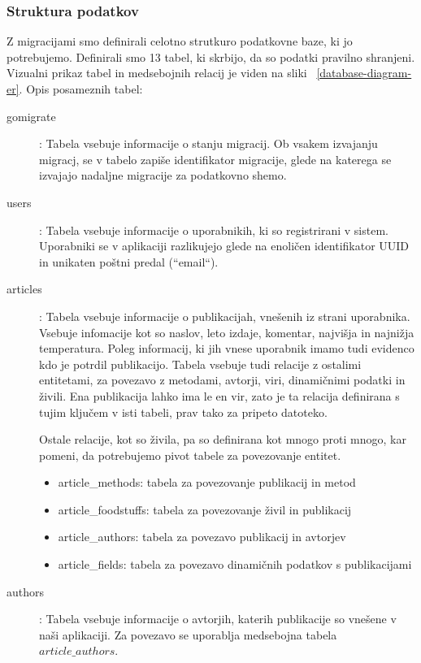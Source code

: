 \documentclass[a4paper, 12pt]{book}
\begin{document}
\subsubsection{ Struktura podatkov }
Z migracijami smo definirali celotno strutkuro podatkovne baze, ki jo potrebujemo. Definirali smo 13 tabel, ki skrbijo, da so podatki pravilno shranjeni. Vizualni prikaz tabel in medsebojnih relacij je viden na sliki ~\ref{database-diagram-er}. Opis posameznih tabel:
\begin{description}
\item[gomigrate]: Tabela vsebuje informacije o stanju migracij. Ob vsakem izvajanju migracj, se v tabelo zapiše identifikator migracije, glede na katerega se izvajajo nadaljne migracije za podatkovno shemo. 

\item[users]: Tabela vsebuje informacije o uporabnikih, ki so registrirani v sistem. Uporabniki se v aplikaciji razlikujejo glede na enoličen identifikator UUID in unikaten poštni predal (``email``). 

\item[articles]: Tabela vsebuje informacije o publikacijah, vnešenih iz strani uporabnika. Vsebuje infomacije kot so naslov, leto izdaje, komentar, najvišja in najnižja temperatura. Poleg informacij, ki jih vnese uporabnik imamo tudi evidenco kdo je potrdil publikacijo. Tabela vsebuje tudi relacije z ostalimi entitetami, za povezavo z metodami, avtorji, viri, dinamičnimi podatki in živili. Ena publikacija lahko ima le en vir, zato je ta relacija definirana s tujim ključem v isti tabeli, prav tako za pripeto datoteko. 

Ostale relacije, kot so živila, pa so definirana kot mnogo proti mnogo, kar pomeni, da potrebujemo pivot tabele za povezovanje entitet.
\begin{itemize}
    \item article\_methods: tabela za povezovanje publikacij in metod
    \item article\_foodstuffs: tabela za povezovanje živil in publikacij
    \item article\_authors: tabela za povezavo publikacij in avtorjev
    \item article\_fields: tabela za povezavo dinamičnih podatkov s publikacijami
\end{itemize}

\item[authors]: Tabela vsebuje informacije o avtorjih, katerih publikacije so vnešene v naši aplikaciji. Za povezavo se uporablja medsebojna tabela $article\_authors$.


\end{description}
\end{document}
